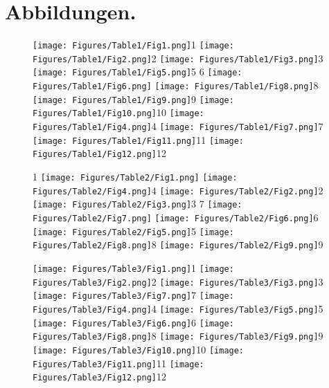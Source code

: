 \documentclass[a4paper, 11pt, oneside]{article}
\begin{document}
\section{Abbildungen.}
\clearpage
\setlength\intextsep{0pt}
\pagestyle{fancy}
\fancyhf{}
\cfoot{\thepage}
\begin{figure}[p]
\texttt{[image: Figures/Table1/Fig1.png]}\tiny 1
\texttt{[image: Figures/Table1/Fig2.png]}\tiny 2
\texttt{[image: Figures/Table1/Fig3.png]}\tiny 3
\texttt{[image: Figures/Table1/Fig5.png]}\tiny 5
\tiny   6
\texttt{[image: Figures/Table1/Fig6.png]}
\texttt{[image: Figures/Table1/Fig8.png]}\tiny 8
\texttt{[image: Figures/Table1/Fig9.png]}\tiny 9
\texttt{[image: Figures/Table1/Fig10.png]}\tiny 10
\texttt{[image: Figures/Table1/Fig4.png]}\tiny 4
\texttt{[image: Figures/Table1/Fig7.png]}\tiny 7
\texttt{[image: Figures/Table1/Fig11.png]}\tiny 11
\texttt{[image: Figures/Table1/Fig12.png]}\tiny 12
\end{figure}
\clearpage
{}
\cfoot{\thepage}
\begin{figure}[p]
\tiny 1
\texttt{[image: Figures/Table2/Fig1.png]}
\texttt{[image: Figures/Table2/Fig4.png]}\tiny 4
\texttt{[image: Figures/Table2/Fig2.png]}\tiny 2
\texttt{[image: Figures/Table2/Fig3.png]}\tiny 3
\tiny 7
\texttt{[image: Figures/Table2/Fig7.png]}
\texttt{[image: Figures/Table2/Fig6.png]}\tiny 6
\texttt{[image: Figures/Table2/Fig5.png]}\tiny 5
\texttt{[image: Figures/Table2/Fig8.png]}\tiny 8
\texttt{[image: Figures/Table2/Fig9.png]}\tiny 9
\end{figure}
\clearpage
{}
\cfoot{\thepage}
\begin{figure}[p]
\texttt{[image: Figures/Table3/Fig1.png]}\tiny 1
\texttt{[image: Figures/Table3/Fig2.png]}\tiny 2
\texttt{[image: Figures/Table3/Fig3.png]}\tiny 3
\texttt{[image: Figures/Table3/Fig7.png]}\tiny 7
\texttt{[image: Figures/Table3/Fig4.png]}\tiny 4
\texttt{[image: Figures/Table3/Fig5.png]}\tiny 5
\texttt{[image: Figures/Table3/Fig6.png]}\tiny 6
\texttt{[image: Figures/Table3/Fig8.png]}\tiny 8
\texttt{[image: Figures/Table3/Fig9.png]}\tiny 9
\texttt{[image: Figures/Table3/Fig10.png]}\tiny 10
\texttt{[image: Figures/Table3/Fig11.png]}\tiny 11
\texttt{[image: Figures/Table3/Fig12.png]}\tiny 12
\end{figure}
\end{document}
